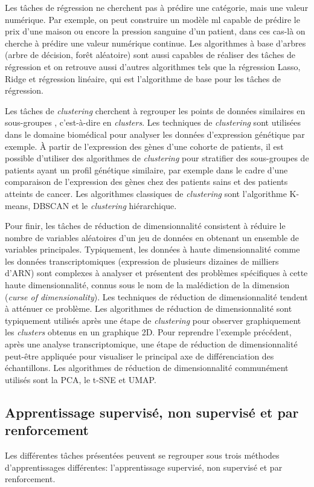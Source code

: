 Les tâches de régression ne cherchent pas à prédire une catégorie, mais une valeur numérique. Par exemple, on peut construire un modèle \gls{ml} capable de prédire le prix d'une maison ou encore la pression sanguine d'un patient, dans ces cas-là on cherche à prédire une valeur numérique continue. Les algorithmes à base d'arbres (arbre de décision, forêt aléatoire) sont aussi capables de réaliser des tâches de régression et on retrouve aussi d'autres algorithmes tels que la régression Lasso, Ridge et régression linéaire, qui est l'algorithme de base pour les tâches de régression.

Les tâches de \textit{clustering} cherchent à regrouper les points de données similaires en sous-groupes , c'est-à-dire en \textit{clusters}. Les techniques de \textit{clustering} sont utilisées dans le domaine biomédical pour analyser les données d'expression génétique par exemple. À partir de l'expression des gènes d'une cohorte de patients, il est possible d'utiliser des algorithmes de \textit{clustering} pour stratifier des sous-groupes de patients ayant un profil génétique similaire, par exemple dans le cadre d'une comparaison de l'expression des gènes chez des patients sains et des patients atteints de cancer. Les algorithmes classiques de \textit{clustering} sont l'algorithme K-means, DBSCAN et le \textit{clustering} hiérarchique.

Pour finir, les tâches de réduction de dimensionnalité consistent à réduire le nombre de variables aléatoires d'un jeu de données en obtenant un ensemble de variables principales. Typiquement, les données à haute dimensionnalité comme les données transcriptomiques (expression de plusieurs dizaines de milliers d'ARN) sont complexes à analyser et présentent des problèmes spécifiques à cette haute dimensionnalité, connus sous le nom de la malédiction de la dimension (\textit{curse of dimensionality}). Les techniques de réduction de dimensionnalité tendent à atténuer ce problème. Les algorithmes de réduction de dimensionnalité sont typiquement utilisés après une étape de \textit{clustering} pour observer graphiquement les \textit{clusters} obtenus en un graphique 2D. Pour reprendre l'exemple précédent, après une analyse transcriptomique, une étape de réduction de dimensionnalité peut-être appliquée pour visualiser le principal axe de différenciation des échantillons. Les algorithmes de réduction de dimensionnalité communément utilisés sont la PCA, le t-SNE et UMAP.

\subsection{Apprentissage supervisé, non supervisé et par renforcement}
Les différentes tâches présentées peuvent se regrouper sous trois méthodes d'apprentissages différentes: l'apprentissage supervisé, non supervisé et par renforcement.

